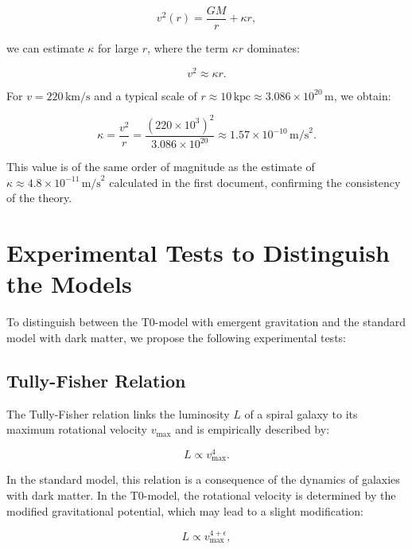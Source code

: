 \documentclass[a4paper,12pt]{article}
\begin{document}
	\begin{equation}
		v^2(r) = \frac{G M}{r} + \kappa r,
	\end{equation}
	
	we can estimate \( \kappa \) for large \( r \), where the term \( \kappa r \) dominates:
	
	\begin{equation}
		v^2 \approx \kappa r.
	\end{equation}
	
	For \( v = 220 \, \text{km/s} \) and a typical scale of \( r \approx 10 \, \text{kpc} \approx 3.086 \times 10^{20} \, \text{m} \), we obtain:
	
	\begin{equation}
		\kappa = \frac{v^2}{r} = \frac{(220 \times 10^3)^2}{3.086 \times 10^{20}} \approx 1.57 \times 10^{-10} \, \text{m/s}^2.
	\end{equation}
	
	This value is of the same order of magnitude as the estimate of \( \kappa \approx 4.8 \times 10^{-11} \, \text{m/s}^2 \) calculated in the first document, confirming the consistency of the theory.
	
	\section{Experimental Tests to Distinguish the Models}
	
	To distinguish between the T0-model with emergent gravitation and the standard model with dark matter, we propose the following experimental tests:
	
	\subsection{Tully-Fisher Relation}
	
	The Tully-Fisher relation links the luminosity \( L \) of a spiral galaxy to its maximum rotational velocity \( v_{\text{max}} \) and is empirically described by:
	
	\begin{equation}
		L \propto v_{\text{max}}^4.
	\end{equation}
	
	In the standard model, this relation is a consequence of the dynamics of galaxies with dark matter. In the T0-model, the rotational velocity is determined by the modified gravitational potential, which may lead to a slight modification:
	
	\begin{equation}
		L \propto v_{\text{max}}^{4 + \epsilon},
	\end{equation}
	
\end{document}
